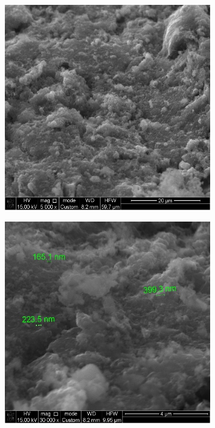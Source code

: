 \begin{figure}[H]
	\centering
	\includegraphics[width=0.8\textwidth]{media/chem2/image13}
	\caption*{}
\end{figure}

\begin{figure}[H]
	\centering
	\includegraphics[width=0.8\textwidth]{media/chem2/image14}
	\caption*{}
\end{figure}

